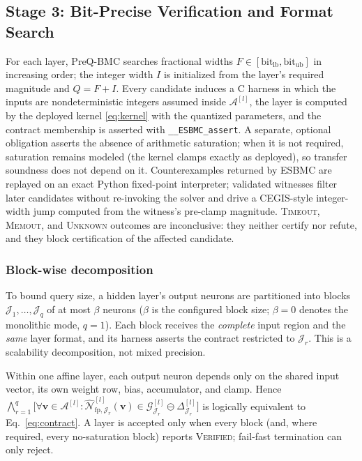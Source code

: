\subsection{Stage 3: Bit-Precise Verification and Format Search}
\label{sec:search}
 
For each layer, PreQ-BMC searches fractional widths
$F \in [\mathrm{bit}_{\mathrm{lb}}, \mathrm{bit}_{\mathrm{ub}}]$ in
increasing order; the integer width $I$ is initialized from the layer's
required magnitude and $Q = F + I$. Every candidate induces a C harness
in which the inputs are nondeterministic integers assumed inside
$\mathcal{A}^{[l]}$, the layer is computed by the deployed kernel
\eqref{eq:kernel} with the quantized parameters, and the contract
membership is asserted with \texttt{\_\_ESBMC\_assert}. A separate,
optional obligation asserts the absence of arithmetic saturation; when
it is not required, saturation remains modeled (the kernel clamps
exactly as deployed), so transfer soundness does not depend on it.
Counterexamples returned by ESBMC are replayed on an exact Python
fixed-point interpreter; validated witnesses filter later candidates
without re-invoking the solver and drive a CEGIS-style integer-width
jump computed from the witness's pre-clamp magnitude. \textsc{Timeout},
\textsc{Memout}, and \textsc{Unknown} outcomes are inconclusive:
they neither certify nor refute, and they block certification of the
affected candidate.
 
\subsubsection{Block-wise decomposition}
\label{sec:blocks}
To bound query size, a hidden layer's output neurons are partitioned
into blocks $\mathcal{J}_1,\dots,\mathcal{J}_q$ of at most $\beta$
neurons ($\beta$ is the configured block size; $\beta = 0$ denotes the
monolithic mode, $q=1$). Each block receives the \emph{complete} input
region and the \emph{same} layer format, and its harness asserts the
contract restricted to $\mathcal{J}_r$. This is a scalability
decomposition, not mixed precision.
 
\begin{lemma}
\label{lem:blocks}
Within one affine layer, each output neuron depends only on the shared
input vector, its own weight row, bias, accumulator, and clamp.
Hence
$\bigwedge_{r=1}^{q}\bigl[\forall \mathbf{v}\in\mathcal{A}^{[l]}:
\widehat{\mathcal{N}}^{[l]}_{\mathrm{fp},\mathcal{J}_r}(\mathbf{v})\in
\mathcal{G}^{[l]}_{\mathcal{J}_r}\ominus\Delta^{[l]}_{\mathcal{J}_r}\bigr]$
is logically equivalent to Eq.~\eqref{eq:contract}. A layer is accepted
only when every block (and, where required, every no-saturation block)
reports \textsc{Verified}; fail-fast termination can only reject.
\end{lemma}
 
